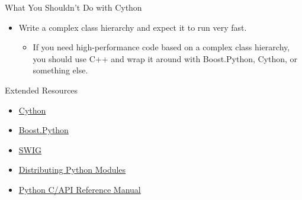 \documentclass[dvips,xcolor=pst,14pt]{beamer}
\begin{document}
\begin{frame}{
%
What You Shouldn't Do with Cython
%
}
\begin{itemize}
\item Write a complex class hierarchy and expect it to run very fast.
\begin{itemize}
  \item If you need high-performance code based on a complex class hierarchy,
  you should use C++ and wrap it around with Boost.Python, Cython, or something
  else.
\end{itemize}
\end{itemize}
\end{frame}

\begin{frame}{
%
Extended Resources
%
}
\begin{itemize}
\item \href{http://www.cython.org/}{Cython}
\item \href{http://www.boost.org/doc/libs/1_52_0/libs/python/doc/}%
{Boost.Python}
\item \href{http://www.swig.org/}{SWIG}
\item \href{http://docs.python.org/2/distutils/index.html}%
{Distributing Python Modules}
\item \href{http://docs.python.org/2/c-api/index.html}%
{Python C/API Reference Manual}
\end{itemize}
\end{frame}
\end{document}
